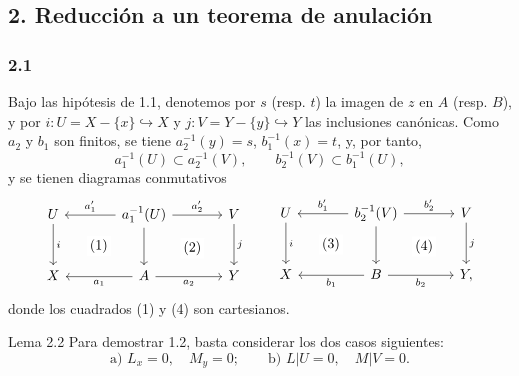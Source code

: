 \subsection*{2. Reducción a un teorema de anulación}

\subsubsection*{2.1}
Bajo las hipótesis de 1.1, denotemos por $s$ (resp. $t$) la imagen de $z$ en $A$ (resp. $B$), y por $i:U=X-\{x\}\hookrightarrow X$ y $j:V=Y-\{y\}\hookrightarrow Y$ las inclusiones canónicas. Como $a_2$ y $b_1$ son finitos, se tiene $a_2^{-1}(y)=s$, $b_1^{-1}(x)=t$, y, por tanto,
\[
a_1^{-1}(U)\subset a_2^{-1}(V),\qquad b_2^{-1}(V)\subset b_1^{-1}(U),
\]
y se tienen diagramas conmutativos
\[
\begin{tikzcd}[column sep=large,row sep=large]
U \arrow[d,"i"] \arrow[rd,phantom,"(1)"{description}] & a_1^{-1}(U) \arrow[l,"a'_1"'] \arrow[r,"a'_2"] \arrow[d] \arrow[rd,phantom,"(2)"{description}] & V \arrow[d,"j"]\\
X & A \arrow[l,"a_1"] \arrow[r,"a_2"'] & Y
\end{tikzcd}
\qquad
\begin{tikzcd}[column sep=large,row sep=large]
U \arrow[d,"i"] \arrow[rd,phantom,"(3)"{description}] & b_2^{-1}(V) \arrow[l,"b'_1"'] \arrow[r,"b'_2"] \arrow[d] \arrow[rd,phantom,"(4)"{description}] & V \arrow[d,"j"]\\
X & B \arrow[l,"b_1"] \arrow[r,"b_2"'] & Y ,
\end{tikzcd}
\]
donde los cuadrados (1) y (4) son cartesianos.

\begin{statement}{Lema 2.2}
Para demostrar 1.2, basta considerar los dos casos siguientes:
\[
\text{a) } L_x=0,\quad M_y=0;\qquad
\text{b) } L|U=0,\quad M|V=0 .
\]
\end{statement}

